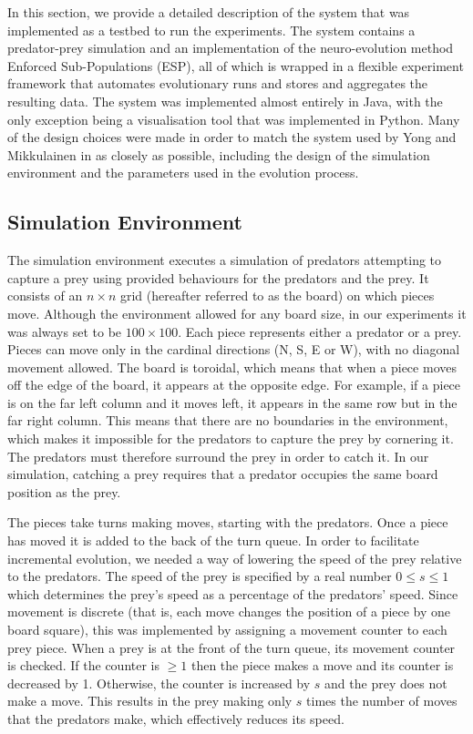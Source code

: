 \documentclass[12pt]{article} %
\begin{document}
In this section, we provide a detailed description of the system that was implemented as a testbed to run the experiments. The system contains a predator-prey simulation and an implementation of the neuro-evolution method Enforced Sub-Populations (ESP), all of which is wrapped in a flexible experiment framework that automates evolutionary runs and stores and aggregates the resulting data. The system was implemented almost entirely in Java, with the only exception being a visualisation tool that was implemented in Python. Many of the design choices were made in order to match the system used by Yong and Mikkulainen in \cite{Yong2001} as closely as possible, including the design of the simulation environment and the parameters used in the evolution process.

\subsection{Simulation Environment}

The simulation environment executes a simulation of predators attempting to capture a prey using provided behaviours for the predators and the prey. It consists of an $n\times n$ grid (hereafter referred to as the board) on which pieces move. Although the environment allowed for any board size, in our experiments it was always set to be $100 \times 100$. Each piece represents either a predator or a prey. Pieces can move only in the cardinal directions (N, S, E or W), with no diagonal movement allowed. The board is toroidal, which means that when a piece moves off the edge of the board, it appears at the opposite edge. For example, if a piece is on the far left column and it moves left, it appears in the same row but in the far right column. This means that there are no boundaries in the environment, which makes it impossible for the predators to capture the prey by cornering it. The predators must therefore surround the prey in order to catch it. In our simulation, catching a prey requires that a predator occupies the same board position as the prey.

The pieces take turns making moves, starting with the predators. Once a piece has moved it is added to the back of the turn queue. In order to facilitate incremental evolution, we needed a way of lowering the speed of the prey relative to the predators. The speed of the prey is specified by a real number $ 0 \leq s \leq 1$ which determines the prey's speed as a percentage of the predators' speed. Since movement is discrete (that is, each move changes the position of a piece by one board square), this was implemented by assigning a movement counter to each prey piece. When a prey is at the front of the turn queue, its movement counter is checked. If the counter is $\geq 1$ then the piece makes a move and its counter is decreased by 1. Otherwise, the counter is increased by $s$ and the prey does not make a move. This results in the prey making only $s$ times the number of moves that the predators make, which effectively reduces its speed.
\end{document}
